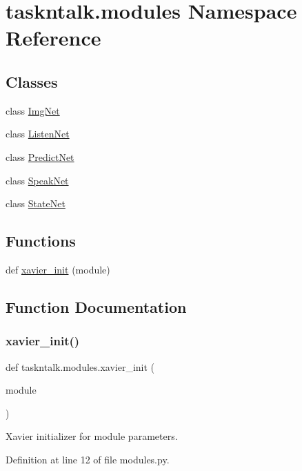 \hypertarget{namespacetaskntalk_1_1modules}{}\section{taskntalk.\+modules Namespace Reference}
\label{namespacetaskntalk_1_1modules}
\subsection*{Classes}
\begin{DoxyCompactItemize}
\item 
class \hyperlink{classtaskntalk_1_1modules_1_1ImgNet}{Img\+Net}
\item 
class \hyperlink{classtaskntalk_1_1modules_1_1ListenNet}{Listen\+Net}
\item 
class \hyperlink{classtaskntalk_1_1modules_1_1PredictNet}{Predict\+Net}
\item 
class \hyperlink{classtaskntalk_1_1modules_1_1SpeakNet}{Speak\+Net}
\item 
class \hyperlink{classtaskntalk_1_1modules_1_1StateNet}{State\+Net}
\end{DoxyCompactItemize}
\subsection*{Functions}
\begin{DoxyCompactItemize}
\item 
def \hyperlink{namespacetaskntalk_1_1modules_a65867c60768600eb7271d39fa3b173e9}{xavier\+\_\+init} (module)
\end{DoxyCompactItemize}


\subsection{Function Documentation}
\mbox{\label{namespacetaskntalk_1_1modules_a65867c60768600eb7271d39fa3b173e9}} 
\subsubsection{\texorpdfstring{xavier\+\_\+init()}{xavier\_init()}}
{\footnotesize\ttfamily def taskntalk.\+modules.\+xavier\+\_\+init (\begin{DoxyParamCaption}\item[{}]{module }\end{DoxyParamCaption})}

\begin{DoxyVerb}Xavier initializer for module parameters.\end{DoxyVerb}
 

Definition at line 12 of file modules.\+py.


